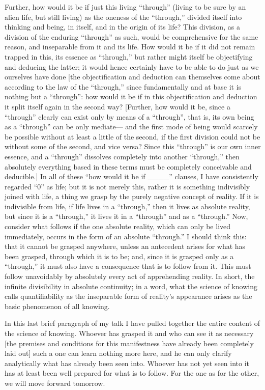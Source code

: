 Further, how would it be if just this living “through”
(living to be sure by an alien life, but still living)
as the oneness of the “through,”
divided itself into thinking and being,
in itself, and in the origin of its life?
This division, as a division of the enduring “through” as such,
would be comprehensive for the same reason,
and inseparable from it and its life.
How would it be if it did not remain trapped in this,
its essence as “through,” but rather might itself
be objectifying and deducing the latter;
it would hence certainly have to be able
to do just as we ourselves have done
[the objectification and deduction
can themselves come about according to the law of the “through,”
since fundamentally and at base it is nothing but a “through”:
how would it be if in this objectification and deduction
it split itself again in the second way?
[Further, how would it be,
since a “through” clearly can exist
only by means of a “through”,
that is, its own being as a “through” can be only mediate—
and the first mode of being
would scarcely be possible
without at least a little of the second,
if the first division could not be
without some of the second, and vice versa?
Since this “through” is our own inner essence,
and a “through” dissolves completely into another “through,”
then absolutely everything based in these terms
must be completely conceivable and deducible.]
In all of these “how would it be if ____” clauses,
I have consistently regarded “0” as life;
but it is not merely this,
rather it is something indivisibly joined with life,
a thing we grasp by the purely negative concept of reality.
If it is indivisible from life,
if life lives in a “through,”
then it lives as absolute reality,
but since it is a “through,”
it lives it in a “through”
and as a “through.”
Now, consider what follows
if the one absolute reality,
which can only be lived immediately,
occurs in the form of an absolute “through.”
I should think this:
that it cannot be grasped anywhere,
unless an antecedent arises
for what has been grasped,
through which it is to be;
and, since it is grasped only as a “through,”
it must also have a consequence
that is to follow from it.
This must follow unavoidably
by absolutely every act
of apprehending reality.
In short, the infinite divisibility in absolute continuity;
in a word, what the science of knowing calls quantifiability
as the inseparable form of reality's appearance
arises as the basic phenomenon of all knowing.

In this last brief paragraph of my talk
I have pulled together the entire content
of the science of knowing.
Whoever has grasped it
and who can see it as necessary
[the premises and conditions for this
manifestness have already been completely laid out]
such a one can learn nothing more here,
and he can only clarify analytically
what has already been seen into.
Whoever has not yet seen into it has
at least been well prepared for what is to follow.
For the one as for the other,
we will move forward tomorrow.

